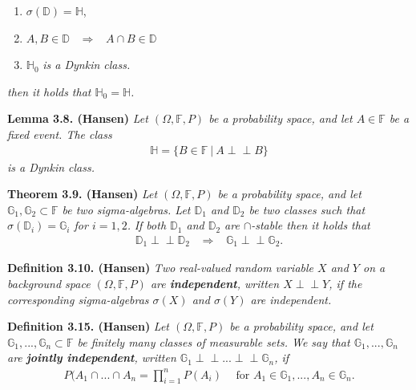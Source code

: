 \documentclass[a4paper,10pt,openany]{book}
\providecommand{\tightlist}{%
 \setlength{\itemsep}{0pt}\setlength{\parskip}{0pt}}
\begin{document}
\begin{enumerate}
\def\labelenumi{\arabic{enumi}.}
\tightlist
\item
  \(\sigma(\mathbb{D})=\mathbb{H}\),
\item
  \(A,B\in\mathbb{D}\hspace{10pt}\Rightarrow\hspace{10pt}A\cap B\in\mathbb{D}\)
\item
  \(\mathbb{H}_0\) \emph{is a Dynkin class.}
\end{enumerate}

\emph{then it holds that \(\mathbb{H}_0=\mathbb{H}\).}

\textbf{Lemma 3.8. (Hansen)} \emph{Let \((\Omega,\mathbb{F},P)\) be a probability space, and let \(A\in\mathbb{F}\) be a fixed event. The class}
\begin{align*}
    \mathbb{H}=\{B\in \mathbb{F}\ \vert\ A\perp \!\!\! \perp B\}
\end{align*}
\emph{is a Dynkin class.}

\textbf{Theorem 3.9. (Hansen)} \emph{Let \((\Omega,\mathbb{F},P)\) be a probability space, and let \(\mathbb{G}_1,\mathbb{G}_2\subset \mathbb{F}\) be two sigma-algebras. Let \(\mathbb{D}_1\) and \(\mathbb{D}_2\) be two classes such that \(\sigma(\mathbb{D}_i)=\mathbb{G}_i\) for \(i=1,2\).}
\emph{If both \(\mathbb{D}_1\) and \(\mathbb{D}_2\) are \(\cap\)-stable then it holds that}
\begin{align*}
    \mathbb{D}_1\perp \!\!\! \perp\mathbb{D}_2\hspace{10pt}\Rightarrow \hspace{10pt} \mathbb{G}_1\perp \!\!\! \perp\mathbb{G}_2.
\end{align*}

\textbf{Definition 3.10. (Hansen)} \emph{Two real-valued random variable \(X\) and \(Y\) on a background space \((\Omega,\mathbb{F},P)\) are \textbf{independent}, written \(X\perp \!\!\! \perp Y\), if the corresponding sigma-algebras \(\sigma(X)\) and \(\sigma(Y)\) are independent.}

\textbf{Definition 3.15. (Hansen)} \emph{Let \((\Omega,\mathbb{F},P)\) be a probability space, and let \(\mathbb{G}_1,...,\mathbb{G}_n\subset \mathbb{F}\) be finitely many classes of measurable sets. We say that \(\mathbb{G}_1,...,\mathbb{G}_n\) are \textbf{jointly independent}, written \(\mathbb{G}_1\perp \!\!\! \perp...\perp \!\!\! \perp\mathbb{G}_n\), if}
\begin{align*}
    P(A_1\cap ...\cap A_n=\prod_{i=1}^nP(A_i)\hspace{15pt}\text{for }A_1\in\mathbb{G}_1,...,A_n\in\mathbb{G}_n.\tag{3.8}
\end{align*}
\end{document}
